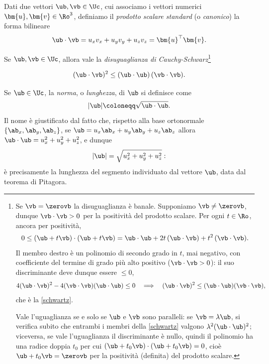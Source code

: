 Dati due vettori $\ub, \vb \in \Uc$, cui associamo i vettori numerici $\bm{u},\bm{v}\in \Ro^3$, definiamo il \textit{prodotto scalare standard} (o \textit{canonico}) la forma bilineare
\begin{equation}
	\ub \cdot \vb = u_x v_x + u_y v_y + u_z v_z = \bm{u}^\top\bm{v}.
\end{equation}

Se $\ub, \vb \in \Uc$, allora vale la \textit{disuguaglianza di
	Cauchy-Schwarz}\footnote{
	Se $\vb=\zerovb$ la disuguaglianza è banale. Supponiamo
	$\vb\neq\zerovb$, dunque $\vb\cdot\vb>0$ per la positività del prodotto
	scalare. Per ogni $t\in\Ro$, ancora per positività,
	\begin{equation*}
		0\le(\ub+t\vb)\cdot(\ub+t\vb)
		=\ub\cdot\ub+2t\,(\ub\cdot\vb)+t^2\,(\vb\cdot\vb).
	\end{equation*}
	Il membro destro è un polinomio di secondo grado in $t$, mai negativo, con coefficiente del termine di grado più alto positivo ($\vb\cdot\vb>0$): il suo discriminante
	deve dunque essere $\le0$,
	\begin{equation*}
		4(\ub\cdot\vb)^2-4(\vb\cdot\vb)(\ub\cdot\ub)\le0
		\quad\Longrightarrow\quad
		(\ub\cdot\vb)^2\le(\ub\cdot\ub)(\vb\cdot\vb),
	\end{equation*}
	che è la \eqref{schwartz}. 
	
	Vale l'uguaglianza se e solo se $\ub$ e $\vb$ sono paralleli: se
	$\vb=\lambda\ub$, si verifica subito che entrambi i membri della
	\eqref{schwartz} valgono $\lambda^2(\ub\cdot\ub)^2$; viceversa, se vale
	l'uguaglianza il discriminante è nullo, quindi il polinomio ha una
	radice doppia $t_0$ per cui $(\ub+t_0\vb)\cdot(\ub+t_0\vb)=0$, cioè
	$\ub+t_0\vb=\zerovb$ per la positività (definita) del prodotto scalare.
}




\begin{equation}
	(\ub\cdot\vb)^2\leq (\ub\cdot\ub)\,(\vb\cdot\vb).
\label{schwartz}
\end{equation}

Se $\ub\in \Uc$, la \textit{norma}, o \textit{lunghezza}, di $\ub$ si
definisce come
\begin{equation}
	|\ub|\coloneqq\sqrt{\ub\cdot\ub}.
\end{equation}
Il nome è giustificato dal fatto che, rispetto alla base ortonormale
$\{\ab_x,\ab_y,\ab_z\}$, se $\ub=u_x\ab_x+u_y\ab_y+u_z\ab_z$ allora
$\ub\cdot\ub=u_x^2+u_y^2+u_z^2$, e dunque
\begin{equation}
	|\ub|=\sqrt{u_x^2+u_y^2+u_z^2}:
\end{equation}
è precisamente la lunghezza del segmento individuato dal vettore $\ub$,
data dal teorema di Pitagora.

